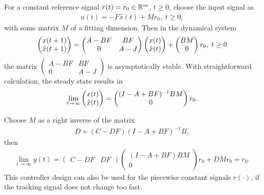 For a constant reference signal $r(t) = r_0 \in {\mathbb{R}}^m$, $t \geq 0$, choose the input signal as 
\begin{align}
u(t) = -F\hat{x}(t) + Mr_0, \; t \geq 0,
\end{align}
with some matrix $M$ of a fitting dimension. 
Then in the dynamical system 
\begin{align}
\begin{split}
\begin{pmatrix}
x(t+1) \\ \tilde{x}(t+1)
\end{pmatrix} = 
\begin{pmatrix}
A - BF & BF \\ 0 & A-J
\end{pmatrix}
\begin{pmatrix}
x(t) \\ \tilde{x}(t)
\end{pmatrix} + 
\begin{pmatrix}
B M \\ 0
\end{pmatrix}r_0, \; t\geq 0
\end{split}
\end{align}
the matrix $\begin{pmatrix}
A - BF & BF \\ 0 & A-J
\end{pmatrix}$ is asymptotically stable. With straightforward calculation, the steady state results in  
\begin{align}
\lim_{t \to \infty}\begin{pmatrix}
x(t) \\ \tilde{x}(t)
\end{pmatrix} = \begin{pmatrix}
(I - A + BF)^{-1 }BM \\ 0
\end{pmatrix}r_0.
\end{align}

Choose $M$ as a right inverse of the matrix 
\begin{align}
D + (C - D F) (I - A + B F)^{-1} B,
\end{align}
then \begin{align}
\lim_{t \to \infty} y(t) = 
\begin{pmatrix}
C - DF & DF
\end{pmatrix}
\begin{pmatrix}
(I - A + BF)BM \\ 0
\end{pmatrix}
r_0 + D M r_0 = r_0.
\end{align}
This controller design can also be used for the piecewise constant signals $r(\cdot)$, if the tracking signal does not change too fast. 
